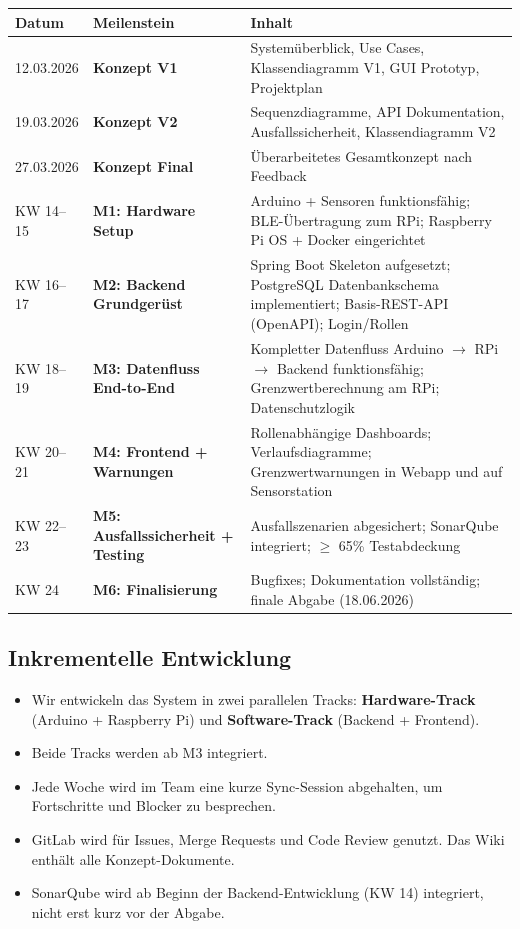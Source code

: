 \documentclass[12pt,a4paper]{article}
\begin{document}
\begin{center}
\begin{tabularx}{\textwidth}{llX}
  \toprule
  \textbf{Datum} & \textbf{Meilenstein} & \textbf{Inhalt} \\
  \midrule
  12.03.2026 & \textbf{Konzept V1} & Systemüberblick, Use Cases, Klassendiagramm V1, GUI Prototyp, Projektplan \\
  19.03.2026 & \textbf{Konzept V2} & Sequenzdiagramme, API Dokumentation, Ausfallssicherheit, Klassendiagramm V2 \\
  27.03.2026 & \textbf{Konzept Final} & Überarbeitetes Gesamtkonzept nach Feedback \\
  \midrule
  KW 14--15  & \textbf{M1: Hardware Setup} & Arduino + Sensoren funktionsfähig; BLE-Übertragung zum RPi; Raspberry Pi OS + Docker eingerichtet \\
  KW 16--17  & \textbf{M2: Backend Grundgerüst} & Spring Boot Skeleton aufgesetzt; PostgreSQL Datenbankschema implementiert; Basis-REST-API (OpenAPI); Login/Rollen \\
  KW 18--19  & \textbf{M3: Datenfluss End-to-End} & Kompletter Datenfluss Arduino $\to$ RPi $\to$ Backend funktionsfähig; Grenzwertberechnung am RPi; Datenschutzlogik \\
  KW 20--21  & \textbf{M4: Frontend + Warnungen} & Rollenabhängige Dashboards; Verlaufsdiagramme; Grenzwertwarnungen in Webapp und auf Sensorstation \\
  KW 22--23  & \textbf{M5: Ausfallssicherheit + Testing} & Ausfallszenarien abgesichert; SonarQube integriert; $\geq$ 65\% Testabdeckung \\
  KW 24      & \textbf{M6: Finalisierung} & Bugfixes; Dokumentation vollständig; finale Abgabe (18.06.2026) \\
  \bottomrule
\end{tabularx}
\end{center}

\subsection{Inkrementelle Entwicklung}
\begin{itemize}
  \item Wir entwickeln das System in zwei parallelen Tracks: \textbf{Hardware-Track} (Arduino + Raspberry Pi) und \textbf{Software-Track} (Backend + Frontend).
  \item Beide Tracks werden ab M3 integriert.
  \item Jede Woche wird im Team eine kurze Sync-Session abgehalten, um Fortschritte und Blocker zu besprechen.
  \item GitLab wird für Issues, Merge Requests und Code Review genutzt. Das Wiki enthält alle Konzept-Dokumente.
  \item SonarQube wird ab Beginn der Backend-Entwicklung (KW 14) integriert, nicht erst kurz vor der Abgabe.
\end{itemize}
\end{document}
